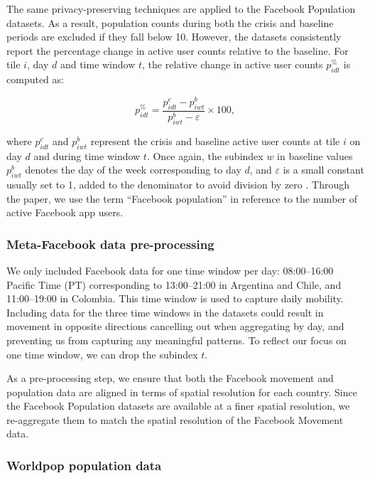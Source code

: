 \documentclass[fleqn,10pt]{wlscirep}
\begin{document}
The same privacy-preserving techniques are applied to the Facebook Population datasets.
As a result, population counts during both the crisis and baseline periods are excluded if they fall below 10. However, the datasets consistently report the percentage change in active user counts relative to the baseline. For tile $i$, day $d$ and time window $t$, the relative change in active user counts $p^{\%}_{idt}$ is computed as:

\begin{equation}
   p^{\%}_{idt} = \dfrac{p^{c}_{idt} - p^b_{iwt}}{p^b_{iwt} - \varepsilon}\times 100, 
\end{equation}

where $p^c_{idt}$ and $p^b_{iwt}$ represent the crisis and baseline active user counts at tile $i$ on day $d$ and during time window $t$. Once again, the subindex $w$ in baseline values $p^b_{iwt}$ denotes the day of the week corresponding to day $d$, and $\varepsilon$ is a small constant usually set to 1, added to the denominator to avoid division by zero \cite{Maas19}. Through the paper, we use the term ``Facebook population'' in reference to the number of active Facebook app users.

\subsubsection*{Meta-Facebook data pre-processing}

We only included Facebook data for one time window per day: 08:00–16:00 Pacific Time (PT) corresponding to 13:00–21:00 in Argentina and Chile, and 11:00–19:00 in Colombia.
This time window is used to capture daily mobility. Including data for the three time windows in the datasets could result in movement in opposite directions cancelling out when aggregating by day, and preventing us from capturing any meaningful patterns. To reflect our focus on one time window, we can drop the subindex $t$.

As a pre-processing step, we ensure that both the Facebook movement and population data are aligned in terms of spatial resolution for each country. Since the Facebook Population datasets are available at a finer spatial resolution, we re-aggregate them to match the spatial resolution of the Facebook Movement data.

\subsubsection*{Worldpop population data}
\end{document}
